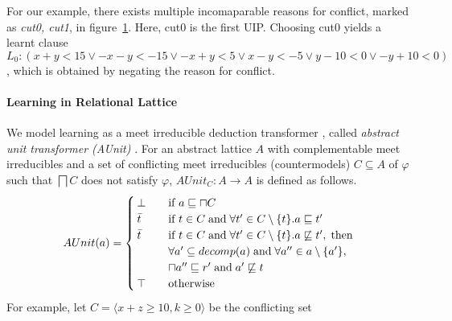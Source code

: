 For our example, there exists multiple incomaparable reasons for conflict,
marked as {\em cut0, cut1}, in figure~\ref{conflict}.  Here, cut0 is the first UIP.  
Choosing cut0 yields a learnt clause  
$L_0: (x+y<15 \vee -x-y<-15 \vee -x+y<5 \vee x-y<-5 \vee y-10<0 \vee -y+10<0)$, 
which is obtained by negating the reason for conflict.  
%
\begin{figure}[t]
\caption{\label{conflict}
}
\end{figure} 
%    
\paragraph{\textbf{Learning in Relational Lattice}}
We model learning as a meet irreducible deduction transformer , called 
{\em abstract unit transformer (AUnit)} .  For an 
abstract lattice $A$ with complementable meet irreducibles 
and a set of conflicting meet irreducibles (countermodels) 
$C \subseteq A$ of $\varphi$ such that $\bigsqcap C$ does not 
satisfy $\varphi$, $AUnit_C: A \rightarrow A$ is defined as follows. 
\[ AUnit(a) =
 \begin{cases}
  \bot       & \quad \text{if } a \sqsubseteq \sqcap{C} \\
  \bar{t}    & \quad \text{if } t \in C \; \text{and} \; \forall t' \in C
  \setminus \{t\}. a  \sqsubseteq t' \\
  \bar{t}    & \quad \text{if } t \in C \; \text{and} \; \forall t' \in C \setminus \{t\}. a
  \not\sqsubseteq t', \; \text{then} \\ 
             & \quad \forall a' \subseteq decomp(a) \;  \text{and} \; \forall a'' \in a \setminus \{a'\}, \\ 
             & \quad \sqcap{a''} \sqsubseteq r' \; \text{and} \; a' \not\sqsubseteq t  \\
  \top & \quad \text{otherwise} \\
 \end{cases}
\]
For example, let $C = \langle x+z \geq 10,  k \geq 0 \rangle$  be the conflicting set 
